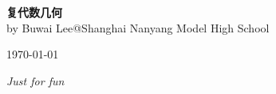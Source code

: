 \documentclass[10pt]{book}
\theoremstyle{definition}
\theoremstyle{plain}
\begin{document}
\begin{titlepage}
\setcounter{page}{-1}
\thispagestyle{empty}
	\begin{flushright}
	{\Huge\bfseries 复代数几何}\\[\baselineskip]
	{by Buwai Lee@Shanghai Nanyang Model High School}\par
	\today
	\end{flushright}
	\vfill
	{\Large\itshape Just for fun}
\end{titlepage}
\clearpage

\frontmatter
	\tableofcontents
\mainmatter
	
\end{document}
